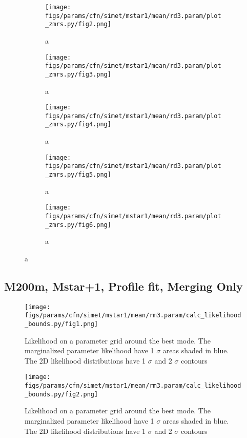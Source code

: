 \documentclass[twocolumn]{article}
\begin{document}
\begin{figure}
  \begin{subfigure}{.5\textwidth}
    \centering\texttt{[image: figs/params/cfn/simet/mstar1/mean/rd3.param/plot\_zmrs.py/fig2.png]}
    \caption{a}
  \end{subfigure}
  \begin{subfigure}{.5\textwidth}
    \centering\texttt{[image: figs/params/cfn/simet/mstar1/mean/rd3.param/plot\_zmrs.py/fig3.png]}
    \caption{a}
  \end{subfigure}
  \begin{subfigure}{.5\textwidth}
    \centering\texttt{[image: figs/params/cfn/simet/mstar1/mean/rd3.param/plot\_zmrs.py/fig4.png]}
    \caption{a}
  \end{subfigure}%
  \begin{subfigure}{.5\textwidth}
    \centering\texttt{[image: figs/params/cfn/simet/mstar1/mean/rd3.param/plot\_zmrs.py/fig5.png]}
    \caption{a}
  \end{subfigure}
  \begin{subfigure}{.5\textwidth}
    \centering\texttt{[image: figs/params/cfn/simet/mstar1/mean/rd3.param/plot\_zmrs.py/fig6.png]}
    \caption{a}
  \end{subfigure}
  
\end{figure}
\clearpage


\subsection{M200m, Mstar+1, Profile fit, Merging Only}
\begin{figure}[H]
  \center\texttt{[image: figs/params/cfn/simet/mstar1/mean/rm3.param/calc\_likelihood\_bounds.py/fig1.png]}
  \caption{Likelihood on a parameter grid around the best mode. The marginalized parameter likelihood have
    1 $\sigma$ areas shaded in blue. The 2D likelihood distributions have 1 $\sigma$  and 2 $\sigma$ contours}
  \label{fig:basic_rd:likelihood}
\end{figure}

\begin{figure}[H]
  \center\texttt{[image: figs/params/cfn/simet/mstar1/mean/rm3.param/calc\_likelihood\_bounds.py/fig2.png]}
  \caption{Likelihood on a parameter grid around the best mode. The marginalized parameter likelihood have
    1 $\sigma$ areas shaded in blue. The 2D likelihood distributions have 1 $\sigma$  and 2 $\sigma$ contours}
  \label{fig:basic_rd:likelihood}
\end{figure}
\end{document}
